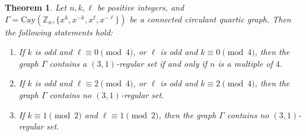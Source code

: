 \documentclass[12pt]{article}
\newtheorem{thmA}[propA]{Theorem}
\begin{document}
   \begin{thmA}\label{thm:31}
 	Let $n, k, \ell$ be positive integers, and $\Gamma = \mathrm{Cay}(\mathbb{Z}_n, \{x^k, x^{-k}, x^\ell, x^{-\ell}\})$ be a connected circulant quartic graph. Then the following statements hold:
 	\begin{enumerate}
 		\item[(i)] If $k$ is odd and $\ell\equiv 0 \pmod{4}$, or $\ell$ is odd and $k\equiv 0 \pmod{4}$, then the graph $\Gamma$ contains a $(3,1)$-regular set if and only if $n$ is a multiple of $4$.
 		\item[(ii)] If $k$ is odd and $\ell\equiv 2 \pmod{4}$, or $\ell$ is odd and $k\equiv 2 \pmod{4}$, then the graph $\Gamma$ contains no $(3,1)$-regular set.
 		\item[(iii)] If \(k \equiv 1 \pmod{2}\) and \(\ell \equiv 1 \pmod{2}\), then the graph \(\Gamma\) contains no \((3,1)\)-regular set.
 	\end{enumerate}
 \end{thmA}
\end{document}
